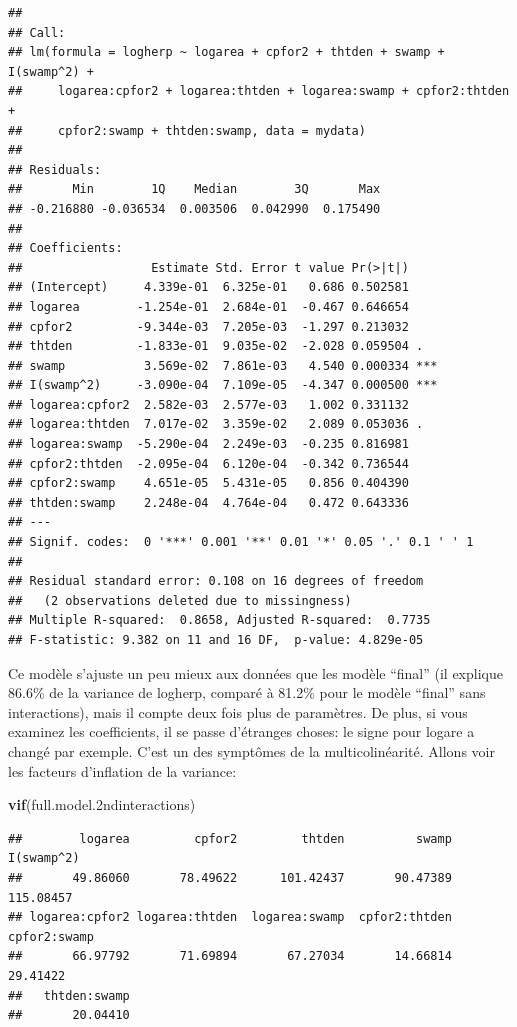 \documentclass[
  12pt,
]{book}
\newenvironment{Shaded}{\begin{snugshade}}{\end{snugshade}}
\newcommand{\FloatTok}[1]{\textcolor[rgb]{0.00,0.00,0.81}{#1}}
\newcommand{\KeywordTok}[1]{\textcolor[rgb]{0.13,0.29,0.53}{\textbf{#1}}}
\newcommand{\NormalTok}[1]{#1}
\begin{document}
\begin{verbatim}
## 
## Call:
## lm(formula = logherp ~ logarea + cpfor2 + thtden + swamp + I(swamp^2) + 
##     logarea:cpfor2 + logarea:thtden + logarea:swamp + cpfor2:thtden + 
##     cpfor2:swamp + thtden:swamp, data = mydata)
## 
## Residuals:
##       Min        1Q    Median        3Q       Max 
## -0.216880 -0.036534  0.003506  0.042990  0.175490 
## 
## Coefficients:
##                  Estimate Std. Error t value Pr(>|t|)    
## (Intercept)     4.339e-01  6.325e-01   0.686 0.502581    
## logarea        -1.254e-01  2.684e-01  -0.467 0.646654    
## cpfor2         -9.344e-03  7.205e-03  -1.297 0.213032    
## thtden         -1.833e-01  9.035e-02  -2.028 0.059504 .  
## swamp           3.569e-02  7.861e-03   4.540 0.000334 ***
## I(swamp^2)     -3.090e-04  7.109e-05  -4.347 0.000500 ***
## logarea:cpfor2  2.582e-03  2.577e-03   1.002 0.331132    
## logarea:thtden  7.017e-02  3.359e-02   2.089 0.053036 .  
## logarea:swamp  -5.290e-04  2.249e-03  -0.235 0.816981    
## cpfor2:thtden  -2.095e-04  6.120e-04  -0.342 0.736544    
## cpfor2:swamp    4.651e-05  5.431e-05   0.856 0.404390    
## thtden:swamp    2.248e-04  4.764e-04   0.472 0.643336    
## ---
## Signif. codes:  0 '***' 0.001 '**' 0.01 '*' 0.05 '.' 0.1 ' ' 1
## 
## Residual standard error: 0.108 on 16 degrees of freedom
##   (2 observations deleted due to missingness)
## Multiple R-squared:  0.8658, Adjusted R-squared:  0.7735 
## F-statistic: 9.382 on 11 and 16 DF,  p-value: 4.829e-05
\end{verbatim}

Ce modèle s'ajuste un peu mieux aux données que les modèle ``final'' (il explique 86.6\% de la variance de logherp, comparé à 81.2\% pour le modèle ``final'' sans interactions), mais il compte deux fois plus de paramètres. De plus, si vous examinez les coefficients, il se passe d'étranges choses: le signe pour logare a changé par exemple. C'est un des symptômes de la multicolinéarité. Allons voir les facteurs d'inflation de la variance:

\begin{Shaded}
\begin{Highlighting}[]
\KeywordTok{vif}\NormalTok{(full.model}\FloatTok{.2}\NormalTok{ndinteractions)}
\end{Highlighting}
\end{Shaded}

\begin{verbatim}
##        logarea         cpfor2         thtden          swamp     I(swamp^2) 
##       49.86060       78.49622      101.42437       90.47389      115.08457 
## logarea:cpfor2 logarea:thtden  logarea:swamp  cpfor2:thtden   cpfor2:swamp 
##       66.97792       71.69894       67.27034       14.66814       29.41422 
##   thtden:swamp 
##       20.04410
\end{verbatim}
\end{document}

